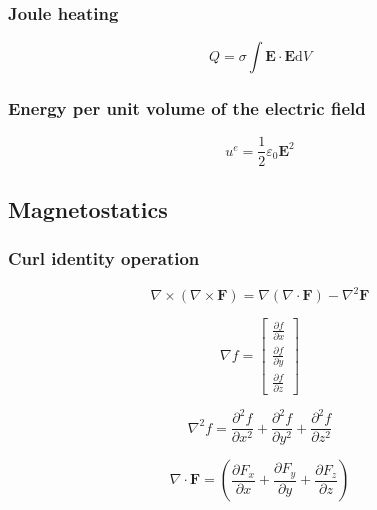 \documentclass[a4paper,10pt]{book}
\begin{document}
\subsubsection{Joule heating}
    \begin{equation}
    Q=\sigma\int\mathbf{E}\cdot\mathbf{E}\mathrm{d}V
    \end{equation}

\subsubsection{Energy per unit volume of the electric field}
    \begin{equation}
    u^e=\frac{1}{2}\varepsilon_0\mathbf{E}^2
    \end{equation}

\subsection{Magnetostatics}

\subsubsection{Curl identity operation}
    \begin{equation}
    \nabla\times\left(\nabla\times\mathbf{F}\right)=\nabla\left(\nabla\cdot\mathbf{F}\right)-\nabla^2\mathbf{F}
    \end{equation}

    \begin{equation}
    \nabla{f}=\left[\begin{array}{c}{\frac{\partial{f}}{\partial{x}}}\\{\frac{\partial{f}}{\partial{y}}}\\{\frac{\partial{f}}{\partial{z}}}\end{array}\right]
    \end{equation}

    \begin{equation}
    \nabla^2{f}=\frac{\partial^2{f}}{\partial{x^2}} + \frac{\partial^2{f}}{\partial{y^2}} + \frac{\partial^2{f}}{\partial{z^2}}
    \end{equation}

    \begin{equation}
    \nabla\cdot\mathbf{F}=\left(\frac{\partial{F_x}}{\partial{x}}+\frac{\partial{F_y}}{\partial{y}}+\frac{\partial{F_z}}{\partial{z}}\right)
    \end{equation}
\end{document}
